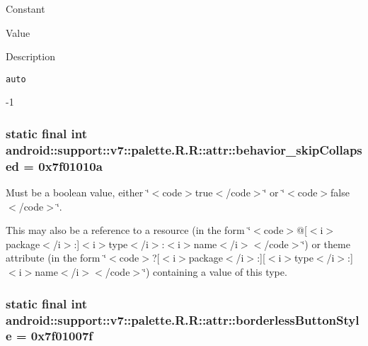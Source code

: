 Constant

Value

Description 

{\tt auto}

-1\hypertarget{classandroid_1_1support_1_1v7_1_1palette_1_1_r_1_1attr_4fed6387755201ae56dd61d0910d3b54}{
\subsubsection[{behavior\_\-skipCollapsed}]{\setlength{\rightskip}{0pt plus 5cm}static final int android::support::v7::palette.R.R::attr::behavior\_\-skipCollapsed = 0x7f01010a}}
\label{classandroid_1_1support_1_1v7_1_1palette_1_1_r_1_1attr_4fed6387755201ae56dd61d0910d3b54}


Must be a boolean value, either \char`\"{}$<$code$>$true$<$/code$>$\char`\"{} or \char`\"{}$<$code$>$false$<$/code$>$\char`\"{}. 

This may also be a reference to a resource (in the form \char`\"{}$<$code$>$@\mbox{[}$<$i$>$package$<$/i$>$:\mbox{]}$<$i$>$type$<$/i$>$:$<$i$>$name$<$/i$>$$<$/code$>$\char`\"{}) or theme attribute (in the form \char`\"{}$<$code$>$?\mbox{[}$<$i$>$package$<$/i$>$:\mbox{]}\mbox{[}$<$i$>$type$<$/i$>$:\mbox{]}$<$i$>$name$<$/i$>$$<$/code$>$\char`\"{}) containing a value of this type. \hypertarget{classandroid_1_1support_1_1v7_1_1palette_1_1_r_1_1attr_86bf2ac73f61c3317bc91e66550d126e}{
\subsubsection[{borderlessButtonStyle}]{\setlength{\rightskip}{0pt plus 5cm}static final int android::support::v7::palette.R.R::attr::borderlessButtonStyle = 0x7f01007f}}
\label{classandroid_1_1support_1_1v7_1_1palette_1_1_r_1_1attr_86bf2ac73f61c3317bc91e66550d126e}


